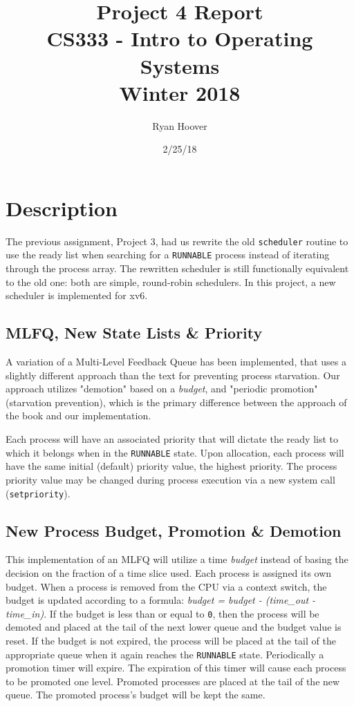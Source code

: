 \documentclass[11pt,letterpaper]{report}
\author{Ryan Hoover}
\title{Project 4 Report\\CS333 - Intro to Operating Systems\\Winter 2018}
\date{2/25/18}
\begin{document}
	\maketitle{}
	\section{Description}
	The previous assignment, Project 3, had us rewrite the old {\tt scheduler} routine to use the ready list when searching for a {\tt RUNNABLE} process instead of iterating through the process array. The rewritten scheduler is still functionally equivalent to the old one: both are simple, round-robin schedulers. In this project, a new scheduler is implemented for xv6.
	
	\subsection{MLFQ, New State Lists \& Priority}

	A variation of a Multi-Level Feedback Queue has been implemented, that uses a slightly different approach than the text for preventing process starvation. Our approach utilizes "demotion" based on a \emph{budget}, and "periodic promotion" (starvation prevention), which is the primary difference between the approach of the book and our implementation.
	
	Each process will have an associated priority that will dictate the ready list to which it belongs when in the {\tt RUNNABLE} state. Upon allocation, each process will have the same initial (default) priority value, the highest priority. The process priority value may be changed during process execution via a new system call ({\tt setpriority}). 
	
	\subsection{New Process Budget, Promotion \& Demotion}
	
	This implementation of an MLFQ will utilize a time \emph{budget} instead of basing the decision on the fraction of a time slice used. Each process is assigned its own budget. When a process is removed from the CPU via a context switch, the budget is updated according to a formula: \emph{budget = budget - (time\_out - time\_in)}. If the budget is less than or equal to {\tt 0}, then the process will be demoted and placed at the tail of the next lower queue and the budget value is reset. If the budget is not expired, the process will be placed at the tail of the appropriate queue when it again reaches the {\tt RUNNABLE} state. Periodically a promotion timer will expire. The expiration of this timer will cause each process to be promoted one level. Promoted processes are placed at the tail of the new queue. The promoted process's budget will be kept the same.
	
\end{document}
